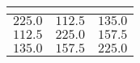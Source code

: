 \begin{table}[!tbp]
\begin{center}
\begin{tabular}{rrr}
\hline\hline
\multicolumn{1}{c}{}&\multicolumn{1}{c}{}&\multicolumn{1}{c}{}\tabularnewline
\hline
$225.0$&$112.5$&$135.0$\tabularnewline
$112.5$&$225.0$&$157.5$\tabularnewline
$135.0$&$157.5$&$225.0$\tabularnewline
\hline
\end{tabular}\end{center}
\end{table}
